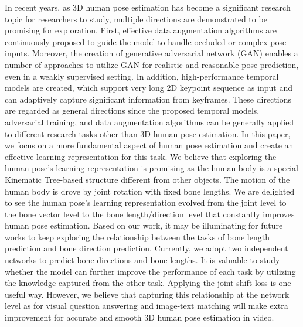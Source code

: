 \documentclass[journal]{IEEEtran}
\begin{document}
In recent years, as 3D human pose estimation has become a significant research topic for researchers to study, multiple directions are demonstrated to be promising for exploration. First, effective data augmentation algorithms \cite{cheng2019occlusion,li2020cascaded} are continuously proposed to guide the model to handle occluded or complex pose inputs. Moreover, the creation of generative adversarial network (GAN) \cite{goodfellow2014generative} enables a number of approaches \cite{yang20183d,wandt2019repnet} to utilize GAN for realistic and reasonable pose prediction, even in a weakly supervised setting. In addition, high-performance temporal models \cite{pavllo20193d,rayat2018exploiting} are created, which support very long 2D keypoint sequence as input and can adaptively capture significant information from keyframes. These directions are regarded as general directions since the proposed temporal models, adversarial training, and data augmentation algorithms can be generally applied to different research tasks other than 3D human pose estimation. In this paper, we focus on a more fundamental aspect of human pose estimation and create an effective learning representation for this task. We believe that exploring the human pose's learning representation is promising as the human body is a special Kinematic Tree-based structure different from other objects. The motion of the human body is drove by joint rotation with fixed bone lengths. We are delighted to see the human pose's learning representation evolved from the joint level to the bone vector level to the bone length/direction level that constantly improves human pose estimation. Based on our work, it may be illuminating for future works to keep exploring the relationship between the tasks of bone length prediction and bone direction prediction. Currently, we adopt two independent networks to predict bone directions and bone lengths. It is valuable to study whether the model can further improve the performance of each task by utilizing the knowledge captured from the other task. Applying the joint shift loss is one useful way. However, we believe that capturing this relationship at the network level as \cite{nam2017dual,lee2018stacked} for visual question answering and image-text matching will make extra improvement for accurate and smooth 3D human pose estimation in video. 



















































\ifCLASSOPTIONcaptionsoff
  \newpage
\fi



\end{document}
